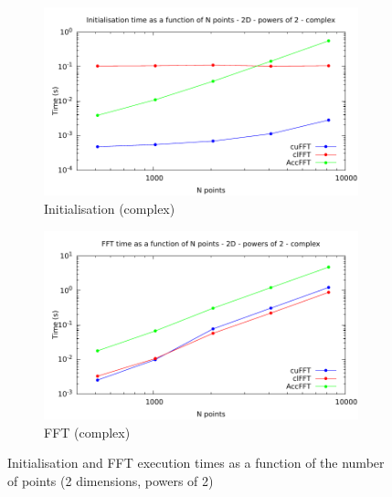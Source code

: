 \documentclass[12pt, a4paper]{article}
\begin{document}
\begin{figure}[htb]
\begin{subfigure}{.5\textwidth}
\centering
\includegraphics[width=.9\linewidth]{graphs/fft-2d-pow2-c-init.pdf}
\caption{Initialisation (complex)}
\label{FFTPOW22DCI}
\end{subfigure}%
\begin{subfigure}{.5\textwidth}
\centering
\includegraphics[width=.9\linewidth]{graphs/fft-2d-pow2-c-exec.pdf}
\caption{FFT (complex)}
\label{FFTPOW22DCE}
\end{subfigure}
\caption{Initialisation and FFT execution times as a function of the number of points (2 dimensions, powers of 2)}
\label{FFTPOW22D}
\end{figure}
\end{document}
